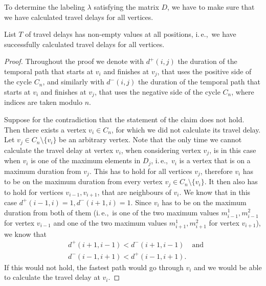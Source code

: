 \documentclass[a4paper,UKenglish,cleveref, autoref, thm-restate, anonymous]{lipics-v2021}
\newcommand{\ie}{i.\,e.,\ }
\begin{document}
To determine the labeling $\lambda$ satisfying the matrix $D$, we have to make sure that we have calculated travel delays for all vertices.

\begin{lemma}
List $T$ of travel delays has non-empty values at all positions, \ie we have successfully calculated travel delays for all vertices.
\end{lemma}
\begin{proof}
    Throughout the proof we
    denote with $d^+(i,j)$ the duration of the temporal path that starts at $v_i$ and finishes at $v_j$, that uses the positive side of the cycle $C_n$,
    and similarly with $d^-(i,j)$ the duration of the temporal path that starts at $v_i$ and finishes at $v_j$, that uses the negative side of the cycle $C_n$,
    where indices are taken modulo $n$.
    
    Suppose for the contradiction that the statement of the claim does not hold. Then there exists a vertex $v_i \in C_n$, for which we did not calculate its travel delay.
    Let $v_j \in C_n \setminus \{v_i\}$ be an arbitrary vertex. 
    Note that the only time we cannot calculate the travel delay at vertex $v_i$, when considering vertex $v_j$, is in this case when $v_i$ is one of the maximum elements in $D_j$, \ie $v_i$ is a vertex that is on a maximum duration from $v_j$.
    This has to hold for all vertices $v_j$, therefore $v_i$ has to be on the maximum duration from every vertex $v_j \in C_n \setminus \{v_i\}$.
    It then also has to hold for vertices $v_{i-1}, v_{i+1}$, that are neighbours of $v_i$.
    We know that in this case $d^+(i-1,i) = 1, d^-(i+1,i) = 1$.
    Since $v_i$ has to be on the maximum duration from both of them 
    (\ie is one of the two maximum values $m^1_{i-1}, m^2_{i-1}$ for vertex $v_{i-1}$ and one of the two maximum values $m^1_{i+1}, m^2_{i+1}$ for vertex $v_{i+1}$),
    we know that 
    \begin{align}\label{eq:cycle-travel-delays-all}
        & d^+(i+1,i-1) < d^-(i+1,i-1) & \text{and}\\
        & d^-(i-1,i+1) < d^+(i-1,i+1).
    \end{align}
    If this would not hold, the fastest path would go through $v_i$ and we would be able to calculate the travel delay at $v_i$.
    

\end{proof}
\end{document}
